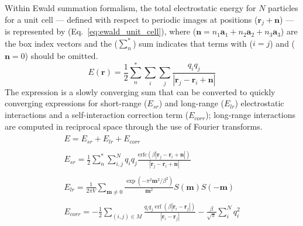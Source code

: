 Within Ewald summation formalism, the total electrostatic energy for $N$ particles for a unit cell --- defined with respect to periodic images at positions ($\mathbf{r}_j + \mathbf{n}$) --- is represented by (Eq.~\ref{eq:ewald_unit_cell}), where ($\mathbf{n} =  n_1\mathbf{a}_1 + n_2\mathbf{a}_2 + n_3\mathbf{a}_3$) are the box index vectors and the ($\sum_{n}^{\ast}$) sum indicates that terms with ($i=j$) and ($\mathbf{n} = 0$) should be omitted. 
%
\begin{equation} \label{eq:ewald_unit_cell}
E(\mathbf{r}) = \frac{1}{2}\sum_{n}^{\ast}\sum_{i} \sum_{j} \frac{q_i q_j}{{\left| \mathbf{r}_j - \mathbf{r}_i + \mathbf{n} \right| }}
\end{equation}
%
The expression is a slowly converging sum that can be converted to quickly converging expressions for short-range ($E_{sr}$) and long-range ($E_{lr}$) electrostatic interactions and a self-interaction correction term ($E_{corr}$); long-range interactions are computed in reciprocal space through the use of Fourier transforms. \cite{ewald1921berechnung, Essmann1995}
%
\begin{subequations} \label{eq:ewald_sep}
\begin{align}
\begin{split}
E = E_{sr} + E_{lr} + E_{corr} 
\end{split}\\
\begin{split} \label{eq:ewald_sr}
E_{sr} = \frac{1}{2} \sum_{n}^{\ast} \sum_{i,j}^{N}  q_i q_j \frac{\mbox{erfc}\left(\beta \left| \mathbf{r}_j - \mathbf{r}_i + \mathbf{n} \right|\right)}{\left| \mathbf{r}_j - \mathbf{r}_i + \mathbf{n} \right|}
\end{split}\\
\begin{split} \label{eq:ewald_lr}
E_{lr} = \frac{1}{2 \pi V} \sum_{\mathbf{m} \neq 0} \frac{ \exp{(- \pi^2 \mathbf{m}^2 / \beta^2)}}{\mathbf{m}^2} S(\mathbf{m}) S(-\mathbf{m})
\end{split}\\
\begin{split} \label{eq:ewald_corr}
E_{corr}=-\frac{1}{2} \sum_{(i, j) \in M} \frac{q_{i} q_{j} \operatorname{erf}\left(\beta\left|\mathbf{r}_{i}-\mathbf{r}_{j}\right|\right)}{\left|\mathbf{r}_{i}-\mathbf{r}_{j}\right|}-\frac{\beta}{\sqrt{\pi}} \sum_{i}^{N} q_{i}^{2}
\end{split}
\end{align}
\end{subequations}
%
